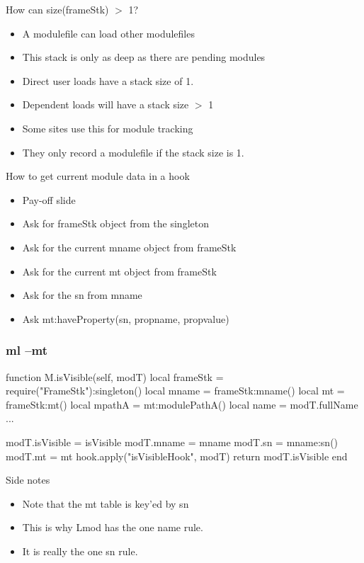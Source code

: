 \documentclass{beamer}
\begin{document}
\begin{frame}{How can size(frameStk) $>$ 1? }
  \begin{itemize}
    \item A modulefile can load other modulefiles
    \item This stack is only as deep as there are pending modules
    \item Direct user loads have a stack size of 1.
    \item Dependent loads will have a stack size $>$ 1
    \item Some sites use this for module tracking
    \item They only record a modulefile if the stack size is 1.
  \end{itemize}
\end{frame}

\begin{frame}{How to get current module data in a hook}
  \begin{itemize}
    \item {\color{blue} Pay-off slide}
    \item Ask for frameStk object from the singleton
    \item Ask for the current mname object from frameStk
    \item Ask for the current mt object from frameStk
    \item Ask for the sn from mname
    \item Ask mt:haveProperty(sn, propname, propvalue)
  \end{itemize}
\end{frame}

\begin{frame}[fragile]
  \frametitle{ml --mt}
    {\tiny
\begin{semiverbatim}
function M.isVisible(self, modT)
   local frameStk  = require("FrameStk"):singleton()
   local mname     = frameStk:mname()
   local mt        = frameStk:mt()
   local mpathA    = mt:modulePathA()
   local name      = modT.fullName
   ...

   modT.isVisible = isVisible
   modT.mname     = mname
   modT.sn        = mname:sn()
   modT.mt        = mt
   hook.apply("isVisibleHook", modT)
   return modT.isVisible
end
\end{semiverbatim}
    }
\end{frame}


\begin{frame}{Side notes}
  \begin{itemize}
    \item Note that the mt table is key'ed by sn
    \item This is why Lmod has the one name rule.
    \item It is really the one sn rule.
  \end{itemize}
\end{frame}
\end{document}
